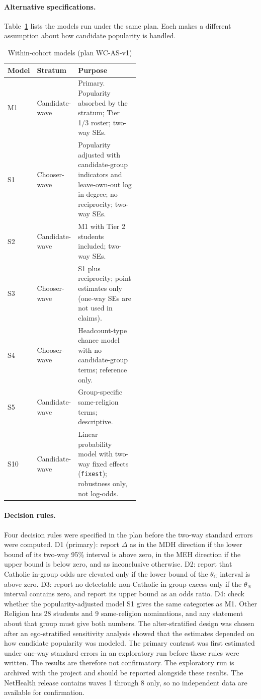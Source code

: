 \paragraph{Alternative specifications.}
Table~\ref{tab:within-models} lists the models run under the same plan. Each makes a different assumption about how candidate popularity is handled.

\begin{table}[ht]
\centering
\caption{Within-cohort models (plan WC-AS-v1)}
\label{tab:within-models}
\begin{tabular}{llp{0.52\linewidth}}
\toprule
Model & Stratum & Purpose \\
\midrule
M1 & Candidate-wave & Primary. Popularity absorbed by the stratum; Tier 1/3 roster; two-way SEs. \\
S1 & Chooser-wave & Popularity adjusted with candidate-group indicators and leave-own-out log in-degree; no reciprocity; two-way SEs. \\
S2 & Candidate-wave & M1 with Tier 2 students included; two-way SEs. \\
S3 & Chooser-wave & S1 plus reciprocity; point estimates only (one-way SEs are not used in claims). \\
S4 & Chooser-wave & Headcount-type chance model with no candidate-group terms; reference only. \\
S5 & Candidate-wave & Group-specific same-religion terms; descriptive. \\
S10 & Candidate-wave & Linear probability model with two-way fixed effects (\texttt{fixest}); robustness only, not log-odds. \\
\bottomrule
\end{tabular}
\end{table}

\paragraph{Decision rules.}
Four decision rules were specified in the plan before the two-way standard errors were computed. D1 (primary): report $\Delta$ as in the MDH direction if the lower bound of its two-way 95\% interval is above zero, in the MEH direction if the upper bound is below zero, and as inconclusive otherwise. D2: report that Catholic in-group odds are elevated only if the lower bound of the $\theta_C$ interval is above zero. D3: report no detectable non-Catholic in-group excess only if the $\theta_N$ interval contains zero, and report its upper bound as an odds ratio. D4: check whether the popularity-adjusted model S1 gives the same categories as M1. Other Religion has 28 students and 9 same-religion nominations, and any statement about that group must give both numbers. The alter-stratified design was chosen after an ego-stratified sensitivity analysis showed that the estimates depended on how candidate popularity was modeled. The primary contrast was first estimated under one-way standard errors in an exploratory run before these rules were written. The results are therefore not confirmatory. The exploratory run is archived with the project and should be reported alongside these results. The NetHealth release contains waves 1 through 8 only, so no independent data are available for confirmation.

